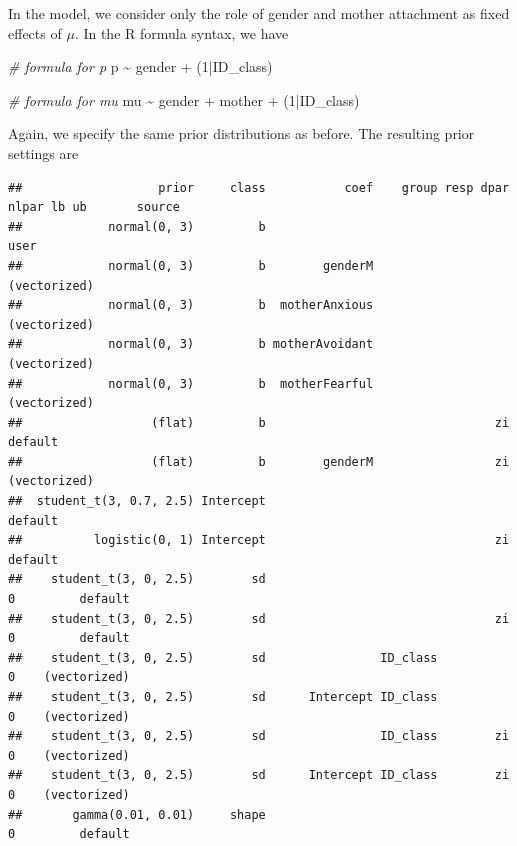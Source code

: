 \documentclass[
]{book}
\newenvironment{Shaded}{\begin{snugshade}}{\end{snugshade}}
\newcommand{\CommentTok}[1]{\textcolor[rgb]{0.56,0.35,0.01}{\textit{#1}}}
\newcommand{\DecValTok}[1]{\textcolor[rgb]{0.00,0.00,0.81}{#1}}
\newcommand{\NormalTok}[1]{#1}
\newcommand{\SpecialCharTok}[1]{\textcolor[rgb]{0.00,0.00,0.00}{#1}}
\begin{document}
In the model, we consider only the role of gender and mother attachment as fixed effects of \(\mu\). In the R formula syntax, we have

\begin{Shaded}
\begin{Highlighting}[]
\CommentTok{\# formula for p}
\NormalTok{p }\SpecialCharTok{\textasciitilde{}}\NormalTok{ gender }\SpecialCharTok{+}\NormalTok{ (}\DecValTok{1}\SpecialCharTok{|}\NormalTok{ID\_class)}

\CommentTok{\# formula for mu}
\NormalTok{mu }\SpecialCharTok{\textasciitilde{}}\NormalTok{ gender }\SpecialCharTok{+}\NormalTok{ mother }\SpecialCharTok{+}\NormalTok{ (}\DecValTok{1}\SpecialCharTok{|}\NormalTok{ID\_class)}
\end{Highlighting}
\end{Shaded}

Again, we specify the same prior distributions as before. The resulting prior settings are

\begin{verbatim}
##                   prior     class           coef    group resp dpar nlpar lb ub       source
##            normal(0, 3)         b                                                       user
##            normal(0, 3)         b        genderM                                (vectorized)
##            normal(0, 3)         b  motherAnxious                                (vectorized)
##            normal(0, 3)         b motherAvoidant                                (vectorized)
##            normal(0, 3)         b  motherFearful                                (vectorized)
##                  (flat)         b                                zi                  default
##                  (flat)         b        genderM                 zi             (vectorized)
##  student_t(3, 0.7, 2.5) Intercept                                                    default
##          logistic(0, 1) Intercept                                zi                  default
##    student_t(3, 0, 2.5)        sd                                          0         default
##    student_t(3, 0, 2.5)        sd                                zi        0         default
##    student_t(3, 0, 2.5)        sd                ID_class                  0    (vectorized)
##    student_t(3, 0, 2.5)        sd      Intercept ID_class                  0    (vectorized)
##    student_t(3, 0, 2.5)        sd                ID_class        zi        0    (vectorized)
##    student_t(3, 0, 2.5)        sd      Intercept ID_class        zi        0    (vectorized)
##       gamma(0.01, 0.01)     shape                                          0         default
\end{verbatim}
\end{document}
